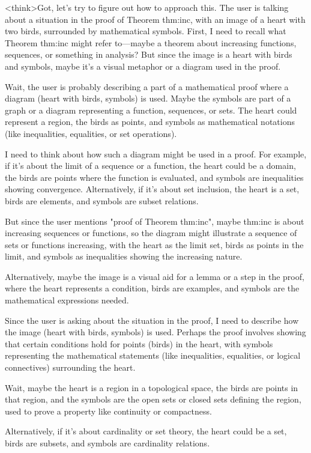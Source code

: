 <think>Got, let's try to figure out how to approach this. The user is talking about a situation in the proof of Theorem thm:inc, with an image of a heart with two birds, surrounded by mathematical symbols. First, I need to recall what Theorem thm:inc might refer to—maybe a theorem about increasing functions, sequences, or something in analysis? But since the image is a heart with birds and symbols, maybe it's a visual metaphor or a diagram used in the proof. 

Wait, the user is probably describing a part of a mathematical proof where a diagram (heart with birds, symbols) is used. Maybe the symbols are part of a graph or a diagram representing a function, sequences, or sets. The heart could represent a region, the birds as points, and symbols as mathematical notations (like inequalities, equalities, or set operations). 

I need to think about how such a diagram might be used in a proof. For example, if it's about the limit of a sequence or a function, the heart could be a domain, the birds are points where the function is evaluated, and symbols are inequalities showing convergence. Alternatively, if it's about set inclusion, the heart is a set, birds are elements, and symbols are subset relations. 

But since the user mentions "proof of Theorem thm:inc", maybe thm:inc is about increasing sequences or functions, so the diagram might illustrate a sequence of sets or functions increasing, with the heart as the limit set, birds as points in the limit, and symbols as inequalities showing the increasing nature. 

Alternatively, maybe the image is a visual aid for a lemma or a step in the proof, where the heart represents a condition, birds are examples, and symbols are the mathematical expressions needed. 

Since the user is asking about the situation in the proof, I need to describe how the image (heart with birds, symbols) is used. Perhaps the proof involves showing that certain conditions hold for points (birds) in the heart, with symbols representing the mathematical statements (like inequalities, equalities, or logical connectives) surrounding the heart. 

Wait, maybe the heart is a region in a topological space, the birds are points in that region, and the symbols are the open sets or closed sets defining the region, used to prove a property like continuity or compactness. 

Alternatively, if it's about cardinality or set theory, the heart could be a set, birds are subsets, and symbols are cardinality relations. 

